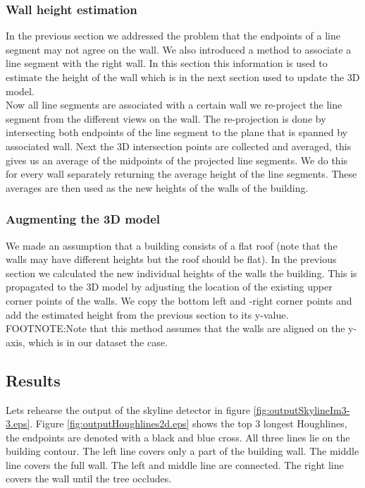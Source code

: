 \documentclass[10pt]{article}
\begin{document}
\subsubsection{Wall height estimation}
	In the previous section we addressed the problem that the endpoints of a line segment may not agree on the wall.  We also introduced a method to associate a line segment with the right wall. In this section this information is used to estimate the height of the wall which is in the next section used to update the 3D model.\\
	Now all line segments are associated with a certain wall we re-project the line segment from the different views on the wall. The re-projection is done by intersecting both endpoints of the line segment to the plane that is spanned by associated wall.
	Next the 3D intersection points are collected and averaged, this gives us an average of the midpoints of the projected line segments. We do this for every wall separately returning the average height of the line segments.
	These averages are then used as the new heights of the walls of the building.

\subsubsection{Augmenting the 3D model} %
	We made an assumption that a building consists of a flat roof (note that the walls may have different heights but the roof should be flat).
	In the previous section we calculated the new individual heights of the walls the building. 
	This is propagated to the 3D model by adjusting the location of the existing upper corner points of the walls. We copy the bottom left and -right corner points and add the estimated height from the previous section to its y-value.
	FOOTNOTE:Note that this method assumes that the walls are aligned on the y-axis, which is in our dataset the case.

	

\subsection{Results}
Lets rehearse the output of the skyline detector in figure \ref{fig:outputSkylineIm3-3.eps}.
Figure \ref{fig:outputHoughlines2d.eps} shows the top 3 longest Houghlines, the
endpoints are denoted with a black and blue cross. All three lines lie on the
building contour.  The left line covers only a part of the building wall. The
middle line covers the full wall. The left and middle line are connected. The
right line covers the wall until the tree occludes.\\
\end{document}
